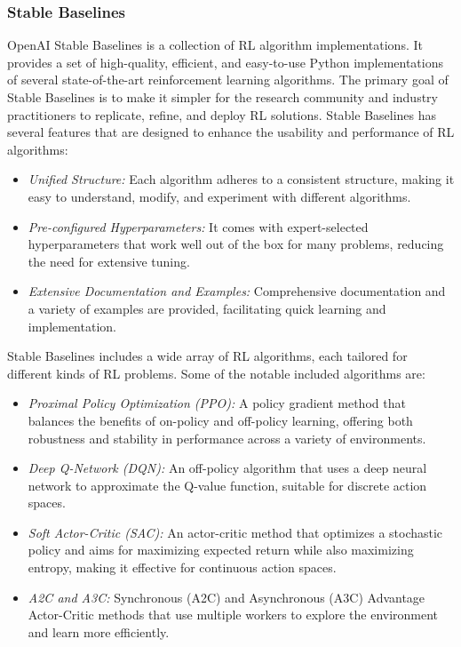\subsubsection*{Stable Baselines}

OpenAI Stable Baselines is a collection of RL algorithm implementations. It provides a set of high-quality, efficient, and easy-to-use Python implementations of several state-of-the-art reinforcement learning algorithms. The primary goal of Stable Baselines is to make it simpler for the research community and industry practitioners to replicate, refine, and deploy RL solutions. Stable Baselines has several features that are designed to enhance the usability and performance of RL algorithms:

\begin{itemize}
    \item \emph{Unified Structure:} Each algorithm adheres to a consistent structure, making it easy to understand, modify, and experiment with different algorithms.
    \item \emph{Pre-configured Hyperparameters:} It comes with expert-selected hyperparameters that work well out of the box for many problems, reducing the need for extensive tuning.
    \item \emph{Extensive Documentation and Examples:} Comprehensive documentation and a variety of examples are provided, facilitating quick learning and implementation.
\end{itemize}

Stable Baselines includes a wide array of RL algorithms, each tailored for different kinds of RL problems. Some of the notable included algorithms are:

\begin{itemize}
    \item \emph{Proximal Policy Optimization (PPO):} A policy gradient method that balances the benefits of on-policy and off-policy learning, offering both robustness and stability in performance across a variety of environments.
    \item \emph{Deep Q-Network (DQN):} An off-policy algorithm that uses a deep neural network to approximate the Q-value function, suitable for discrete action spaces.
    \item \emph{Soft Actor-Critic (SAC):} An actor-critic method that optimizes a stochastic policy and aims for maximizing expected return while also maximizing entropy, making it effective for continuous action spaces.
    \item \emph{A2C and A3C:} Synchronous (A2C) and Asynchronous (A3C) Advantage Actor-Critic methods that use multiple workers to explore the environment and learn more efficiently.
\end{itemize}

